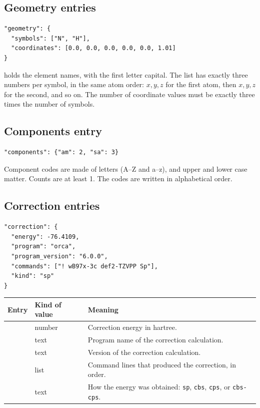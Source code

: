 \subsection{Geometry entries}

\begin{verbatim}
"geometry": {
  "symbols": ["N", "H"],
  "coordinates": [0.0, 0.0, 0.0, 0.0, 0.0, 1.01]
}
\end{verbatim}

 holds the element names, with the first letter capital. The
 list has exactly three numbers per symbol, in the same atom
order: $x,y,z$ for the first atom, then $x,y,z$ for the second, and so on. The
number of coordinate values must be exactly three times the number of symbols.

\subsection{Components entry}

\begin{verbatim}
"components": {"am": 2, "sa": 3}
\end{verbatim}

Component codes are made of letters (A--Z and a--z), and upper and lower case
matter. Counts are at least 1. The codes are written in alphabetical order.

\subsection{Correction entries}

\begin{verbatim}
"correction": {
  "energy": -76.4109,
  "program": "orca",
  "program_version": "6.0.0",
  "commands": ["! wB97x-3c def2-TZVPP Sp"],
  "kind": "sp"
}
\end{verbatim}

\begin{longtable}{@{}L{4.2cm}L{2.3cm}L{7.0cm}@{}}
\toprule
\textbf{Entry} & \textbf{Kind of value} & \textbf{Meaning} \\
\midrule
\endhead
{} & number & Correction energy in hartree. \\
 & text & Program name of the correction calculation. \\
 & text & Version of the correction calculation. \\
 & list & Command lines that produced the correction, in order. \\
 & text & How the energy was obtained: \texttt{sp}, \texttt{cbs},
\texttt{cps}, or \texttt{cbs-cps}. \\
\bottomrule
\end{longtable}

